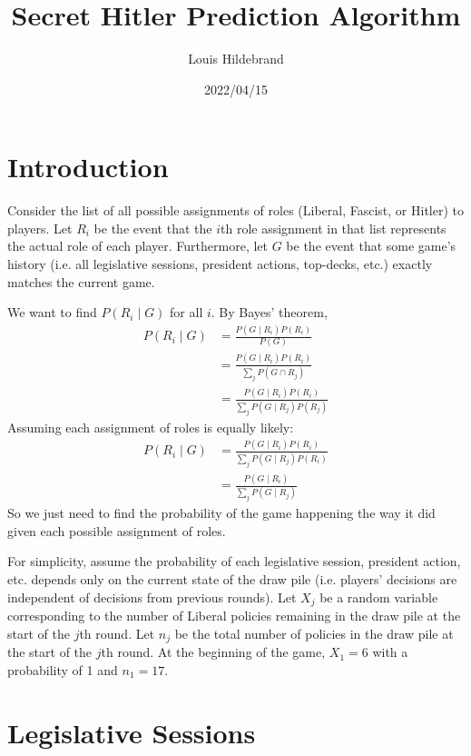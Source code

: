 \documentclass[fleqn, 12pt, letterpaper]{article}
\title{Secret Hitler Prediction Algorithm}
\author{Louis Hildebrand}
\date{2022/04/15}
\begin{document}
\maketitle

\section{Introduction}
Consider the list of all possible assignments of roles (Liberal, Fascist, or Hitler) to players. Let $R_i$ be the event that the $i$th role assignment in that list represents the actual role of each player. Furthermore, let $G$ be the event that some game's history (i.e. all legislative sessions, president actions, top-decks, etc.) exactly matches the current game.

We want to find $P(R_i \mid G)$ for all $i$. By Bayes' theorem,
\begin{align*}
	P(R_i \mid G)
		&= \frac{P(G \mid R_i) P(R_i)}{P(G)} \\
		&= \frac{P(G \mid R_i) P(R_i)}{\sum_j P(G \cap R_j)} \\
		&= \frac{P(G \mid R_i) P(R_i)}{\sum_j P(G \mid R_j) P(R_j)}
\end{align*}
Assuming each assignment of roles is equally likely:
\begin{align*}
	P(R_i \mid G)
		&= \frac{P(G \mid R_i) P(R_i)}{\sum_j P(G \mid R_j) P(R_i)} \\
		&= \frac{P(G \mid R_i)}{\sum_j P(G \mid R_j)}
\end{align*}
So we just need to find the probability of the game happening the way it did given each possible assignment of roles.

For simplicity, assume the probability of each legislative session, president action, etc. depends only on the current state of the draw pile (i.e. players' decisions are independent of decisions from previous rounds). Let $X_j$ be a random variable corresponding to the number of Liberal policies remaining in the draw pile at the start of the $j$th round. Let $n_j$ be the total number of policies in the draw pile at the start of the $j$th round. At the beginning of the game, $X_1 = 6$ with a probability of 1 and $n_1 = 17$.

\section{Legislative Sessions}
\end{document}
